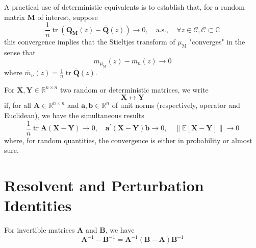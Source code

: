 \begin{remark}
	A practical use of deterministic equivalents is to establish that, for a random matrix $\mathbf{M}$ of interest, suppose
	\begin{equation*}
		\frac{1}{n}\operatorname{tr}\left(\mathbf{Q}_{\mathbf{M}}(z)-\overline{\mathbf{Q}}(z)\right)\rightarrow 0,\quad\text{a.s.},\quad\forall z\in\mathcal{C} ,\mathcal{C}\subset\mathbb{C}
	\end{equation*}
	this convergence implies that the Stieltjes transform of $\mu_{\mathrm{M}}$ "converges" in the sense that
	\begin{equation*}
		m_{\mu_{\mathrm{M}}}(z)-\bar{m}_{n}(z)\rightarrow 0
	\end{equation*}
	where $\bar{m}_{n}(z)=\frac{1}{n}\operatorname{tr}\overline{\mathbf{Q}}(z)$.
\end{remark}

\begin{definition}
	For $\mathbf{X},\mathbf{Y}\in\mathbb{R}^{n \times n}$ two random or deterministic matrices, we write
	\begin{equation}
		\mathbf{X}\leftrightarrow\mathbf{Y}
	\end{equation}
	if, for all $\mathbf{A}\in\mathbb{R}^{n\times n}$ and $\mathbf{a},\mathbf{b}\in\mathbb{R}^{n}$ of unit norms (respectively, operator and Euclidean), we have the simultaneous results
	\begin{equation*}
		\frac{1}{n}\operatorname{tr}\mathbf{A}(\mathbf{X}-\mathbf{Y})\rightarrow 0,\quad \mathbf{a}^{\prime}(\mathbf{X}-\mathbf{Y})\mathbf{b}\rightarrow 0,\quad\|\mathbb{E}[\mathbf{X}-\mathbf{Y}]\|\rightarrow 0
	\end{equation*}
	where, for random quantities, the convergence is either in probability or almost sure.
\end{definition}

\section{Resolvent and Perturbation Identities}

\begin{lemma} \label{lem:resolvent-identity}
	For invertible matrices $\mathbf{A}$ and $\mathbf{B}$, we have
	\begin{equation}
		\mathbf{A}^{-1}-\mathbf{B}^{-1}=\mathbf{A}^{-1}\left(\mathbf{B}-\mathbf{A}\right)\mathbf{B}^{-1}
	\end{equation}
\end{lemma}

